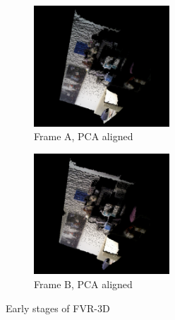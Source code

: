 \begin{figure}[!htb]
         \begin{subfigure}[b]{3.0in}
         		       \centering
                \includegraphics[width=2.0in]{images/methodology/FVR/fvr3d/PCAFrameA}
                \caption{Frame A, PCA aligned}
                \label{fig:fvr3DAAlign}
        \end{subfigure}%
         \begin{subfigure}[b]{3.0in}
                \centering
                \includegraphics[width=2.0in]{images/methodology/FVR/fvr3d/PCAFrameB}
				\caption{Frame B, PCA aligned}
                \label{fig:fvr3DBAlign}
        \end{subfigure}
        

       \caption{Early stages of FVR-3D}
       \label{fig:FVR3D111}
\end{figure}


